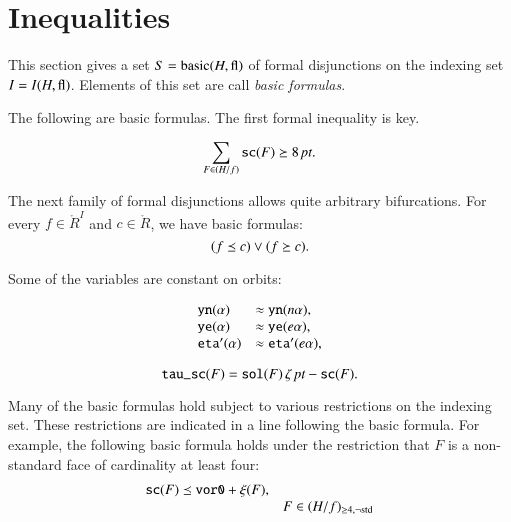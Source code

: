 \section{Inequalities}
%
\label{sec:basic}

This section gives a set $S={\operatorname{basic}}(H,{\operatorname{fl}})$ of formal
disjunctions on the indexing set $I=I(H,{\operatorname{fl}})$. Elements of
this set are call {\it basic formulas}.

The following are basic formulas.  The first formal inequality is
key.

\begin{equation}
    \sum_{F\in (H/f)} {\operatorname{{\texttt{sc}}}}(F) \succeq 8\,\hbox{\it pt}.
    \label{eqn:8pt}
\end{equation}

The next family of formal disjunctions allows quite arbitrary
bifurcations. For every $f\in\ring{R}^I$ and $c\in \ring{R}$, we
have basic formulas:
\begin{equation}
    (f \preceq c) \vee (f \succeq c).
\end{equation}

Some of the variables are constant on orbits:

\begin{equation}
    \begin{array}{lll}
  {\operatorname{{\texttt{yn}}}}(\alpha) &\approx {\operatorname{{\texttt{yn}}}}(n\alpha),\\
  {\operatorname{{\texttt{ye}}}}(\alpha) &\approx {\operatorname{{\texttt{ye}}}}(e\alpha),\\
  {\operatorname{{\texttt{eta}}}}'(\alpha) &\approx {\operatorname{{\texttt{eta}}}}'(e\alpha),\\
  \end{array}
\end{equation}


\begin{equation}
{\operatorname{{\texttt{tau\_sc}}}}(F) = {\operatorname{{\texttt{sol}}}}(F)\,\zeta\,\hbox{\it pt} - {\operatorname{{\texttt{sc}}}}(F).
\end{equation}

Many of the basic formulas hold subject to various restrictions on
the indexing set.  These restrictions are indicated in a line
following the basic formula.  For example, the following basic
formula holds under the restriction that $F$ is a non-standard
face of cardinality at least four:
\begin{equation}
    \label{eqn:xi}
    \begin{array}{lll}
    {\operatorname{{\texttt{sc}}}}(F) \preceq {\operatorname{{\texttt{vor0}}}} + \xi(F),\\
    &F\in (H/f)_{\ge4,\neg{\operatorname{std}}}
    \end{array}
\end{equation}

